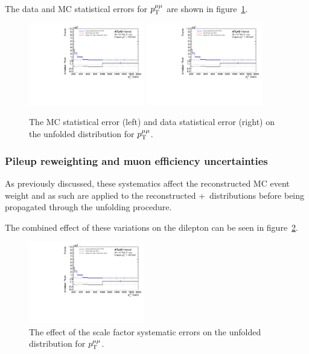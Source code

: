 The data and MC statistical errors for $p_\mathrm{T}^{\mu\mu}$ are shown in figure~\ref{fig:MCDataStatErr}.

\begin{figure}[h!]
  \centering
  \includegraphics[page=152,width=0.45\textwidth]{figures/IBUPlots.pdf}
  \includegraphics[page=154,width=0.45\textwidth]{figures/IBUPlots.pdf}
  \caption{The MC statistical error (left) and data statistical error (right) on the unfolded distribution for $p_\mathrm{T}^{\mu\mu}$.}
  \label{fig:MCDataStatErr}
\end{figure}

\subsubsection{Pileup reweighting and muon efficiency uncertainties}
As previously discussed, these systematics affect the reconstructed MC event weight and as such are applied to the reconstructed \powheg+\pythia~distributions before being propagated through the unfolding procedure.

The combined effect of these variations on the dilepton \pt can be seen in figure~\ref{fig:SFSystErr}.

\begin{figure}[h!]
  \centering
  \includegraphics[page=148,width=0.45\textwidth]{figures/IBUPlots.pdf}
  \caption{The effect of the scale factor systematic errors on the unfolded distribution for $p_\mathrm{T}^{\mu\mu}$.}
  \label{fig:SFSystErr}
\end{figure}

